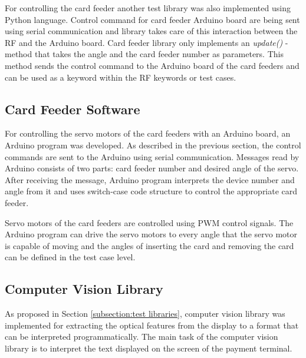 For controlling the card feeder another test library was also implemented using Python language. Control command for card feeder Arduino board are being sent using serial communication and library takes care of this interaction between the RF and the Arduino board. Card feeder library only implements an \emph{update()} -method that takes the angle and the card feeder number as parameters. This method sends the control command to the Arduino board of the card feeders and can be used as a keyword within the RF keywords or test cases.

\subsection{Card Feeder Software}
\label{subsection:card feeder software}

For controlling the servo motors of the card feeders with an Arduino board, an Arduino program was developed. As described in the previous section, the control commands are sent to the Arduino using serial communication. Messages read by Arduino consists of two parts: card feeder number and desired angle of the servo. After receiving the message, Arduino program interprets the device number and angle from it and uses switch-case code structure to control the appropriate card feeder. 

Servo motors of the card feeders are controlled using PWM control signals. The Arduino program can drive the servo motors to every angle that the servo motor is capable of moving and the angles of inserting the card and removing the card can be defined in the test case level.

\subsection{Computer Vision Library}
\label{subsection:Computer vision library}

As proposed in Section \ref{subsection:test libraries}, computer vision library was implemented for extracting the optical features from the display to a format that can be interpreted programmatically. The main task of the computer vision library is to interpret the text displayed on the screen of the payment terminal.

